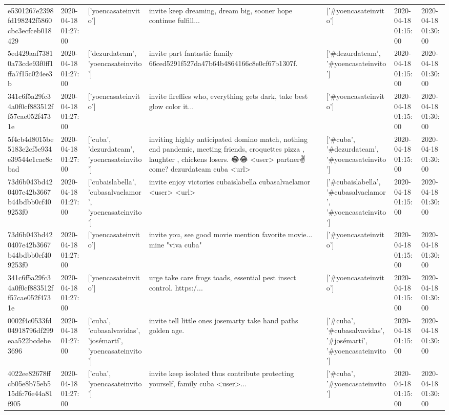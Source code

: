 \begin{tabular}{lllllll}
e5301267e2398fd198242f5860cbc3ecfceb018429 & 2020-04-18 01:27:00 & ['yoencasateinvito'] & invite keep dreaming, dream big, sooner hope continue fulfill... & ['#yoencasateinvito'] & 2020-04-18 01:15:00 & 2020-04-18 01:30:00 \\
5ed429aaf73810a73cde93f0ff1ffa7f15c024ee3b & 2020-04-18 01:27:00 & ['dezurdateam', 'yoencasateinvito'] & invite part fantastic family 66ced5291f527da47b64b4864166c8e0cf67b1307f. & ['#dezurdateam', '#yoencasateinvito'] & 2020-04-18 01:15:00 & 2020-04-18 01:30:00 \\
341c6f5a29fc34a0f0cf883512ff57cae052f4731e & 2020-04-18 01:27:00 & ['yoencasateinvito'] & invite fireflies who, everything gets dark, take best glow color it... & ['#yoencasateinvito'] & 2020-04-18 01:15:00 & 2020-04-18 01:30:00 \\
5f4cb4d8015be5183e2cf5e934e39544e1cac8cbad & 2020-04-18 01:27:00 & ['cuba', 'dezurdateam', 'yoencasateinvito'] & inviting highly anticipated domino match, nothing end pandemic, meeting friends, croquettes pizza , laughter , chickens losers. 😂😂 <user> partner✌️ come? dezurdateam cuba <url> & ['#cuba', '#dezurdateam', '#yoencasateinvito'] & 2020-04-18 01:15:00 & 2020-04-18 01:30:00 \\
73d6b043bd420407e42b3667b44bdbb0cf409253f0 & 2020-04-18 01:27:00 & ['cubaislabella', 'cubasalvaelamor', 'yoencasateinvito'] & invite enjoy victories cubaislabella cubasalvaelamor <user> <url> & ['#cubaislabella', '#cubasalvaelamor', '#yoencasateinvito'] & 2020-04-18 01:15:00 & 2020-04-18 01:30:00 \\
73d6b043bd420407e42b3667b44bdbb0cf409253f0 & 2020-04-18 01:27:00 & ['yoencasateinvito'] & invite you, see good movie mention favorite movie... mine "viva cuba" & ['#yoencasateinvito'] & 2020-04-18 01:15:00 & 2020-04-18 01:30:00 \\
341c6f5a29fc34a0f0cf883512ff57cae052f4731e & 2020-04-18 01:27:00 & ['yoencasateinvito'] & urge take care frogs toads, essential pest insect control. https:/... & ['#yoencasateinvito'] & 2020-04-18 01:15:00 & 2020-04-18 01:30:00 \\
0002f4c0533fd04918796df299eaa522bcdebe3696 & 2020-04-18 01:27:00 & ['cuba', 'cubasalvavidas', 'josémartí', 'yoencasateinvito'] & invite tell little ones josemarty take hand paths golden age. & ['#cuba', '#cubasalvavidas', '#josémartí', '#yoencasateinvito'] & 2020-04-18 01:15:00 & 2020-04-18 01:30:00 \\
4022ee82678ffcb05e8b75eb515dfc76e44a81f905 & 2020-04-18 01:27:00 & ['cuba', 'yoencasateinvito'] & invite keep isolated thus contribute protecting yourself, family cuba <user>... & ['#cuba', '#yoencasateinvito'] & 2020-04-18 01:15:00 & 2020-04-18 01:30:00 \\

\end{tabular}
